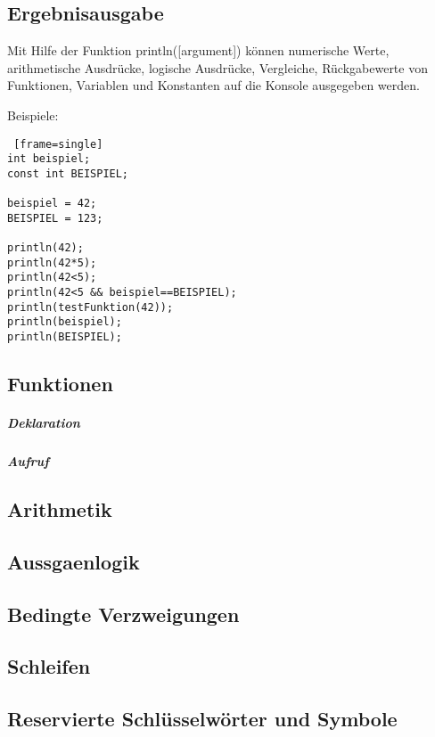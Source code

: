 \subsection{Ergebnisausgabe}
Mit Hilfe der Funktion println([argument]) können numerische Werte, arithmetische Ausdrücke, logische Ausdrücke, Vergleiche, Rückgabewerte von Funktionen, Variablen und Konstanten auf die Konsole ausgegeben werden.

Beispiele:
\begin{lstlisting} [frame=single] 
int beispiel;
const int BEISPIEL;

beispiel = 42;
BEISPIEL = 123;

println(42);
println(42*5);
println(42<5);
println(42<5 && beispiel==BEISPIEL);
println(testFunktion(42));
println(beispiel);
println(BEISPIEL);
\end{lstlisting}


\subsection{Funktionen}

\subparagraph{Deklaration}

\subparagraph{Aufruf}



\subsection{Arithmetik}


\subsection{Aussgaenlogik}

\subsection{Bedingte Verzweigungen}

\subsection{Schleifen}
	
	
\subsection{Reservierte Schlüsselwörter und Symbole}	

